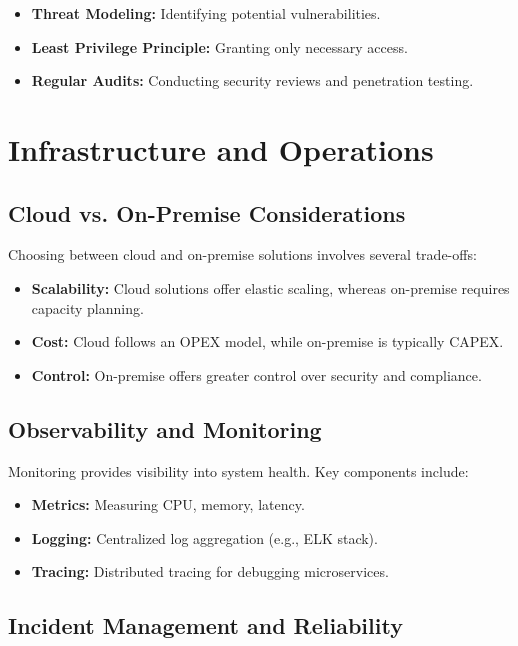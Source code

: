 \begin{itemize}
    \item \textbf{Threat Modeling:} Identifying potential vulnerabilities.
    \item \textbf{Least Privilege Principle:} Granting only necessary access.
    \item \textbf{Regular Audits:} Conducting security reviews and penetration testing.
\end{itemize}

\section{Infrastructure and Operations}

\subsection{Cloud vs. On-Premise Considerations}

Choosing between cloud and on-premise solutions involves several trade-offs:

\begin{itemize}
    \item \textbf{Scalability:} Cloud solutions offer elastic scaling, whereas on-premise requires capacity planning.
    \item \textbf{Cost:} Cloud follows an OPEX model, while on-premise is typically CAPEX.
    \item \textbf{Control:} On-premise offers greater control over security and compliance.
\end{itemize}

\subsection{Observability and Monitoring}

Monitoring provides visibility into system health. Key components include:

\begin{itemize}
    \item \textbf{Metrics:} Measuring CPU, memory, latency.
    \item \textbf{Logging:} Centralized log aggregation (e.g., ELK stack).
    \item \textbf{Tracing:} Distributed tracing for debugging microservices.
\end{itemize}

\subsection{Incident Management and Reliability}

